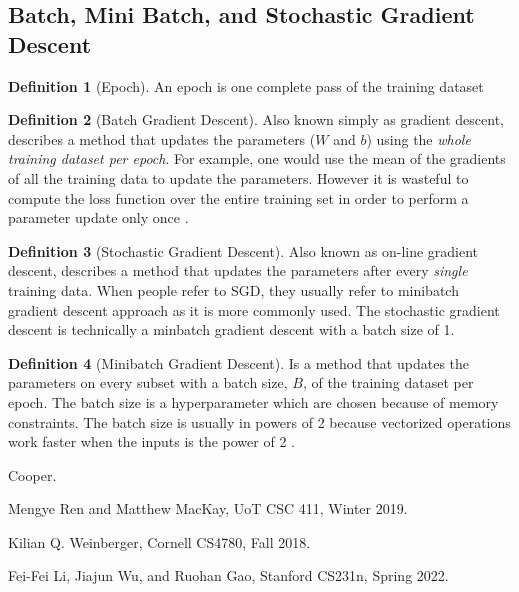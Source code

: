 \documentclass[11pt]{article}
\numberwithin{equation}{section}
\theoremstyle{definition}%
\newtheorem{definition}{Definition}[section]%
\begin{document}
\subsection{Batch, Mini Batch, and Stochastic Gradient Descent}

\begin{definition} [Epoch]
    An epoch is one complete pass of the training dataset
\end{definition}

\begin{definition}[Batch Gradient Descent]
    Also known simply as gradient descent, describes a method that updates the parameters ($W$ and $b$) using the \emph{whole training dataset per epoch}. For example, one would use the mean of the gradients of all the training data to update the parameters. However it is wasteful to compute the loss function over the entire training set in order to perform a parameter update only once \cite{Stanford}.
\end{definition}

\begin{definition}[Stochastic Gradient Descent]
    Also known as on-line gradient descent, describes a method that updates the parameters after every \emph{single} training data. When people refer to SGD, they usually refer to minibatch gradient descent approach as it is more commonly used. The stochastic gradient descent is technically a minbatch gradient descent with a batch size of 1. 
\end{definition}

\begin{definition}[Minibatch Gradient Descent]
    Is a method that updates the parameters on every subset with a batch size, $B$, of the training dataset per epoch. The batch size is a hyperparameter which are chosen because of memory constraints. The batch size is usually in powers of 2 because vectorized operations work faster when the inputs is the power of 2 \cite{Stanford}. 
\end{definition}

\begin{thebibliography}{2}
     Cooper.

     Mengye Ren and Matthew MacKay, UoT CSC 411, Winter 2019.

     Kilian Q. Weinberger, Cornell CS4780, Fall 2018.

     Fei-Fei Li, Jiajun Wu, and Ruohan Gao, Stanford CS231n, Spring 2022.

\end{thebibliography}
\end{document}
